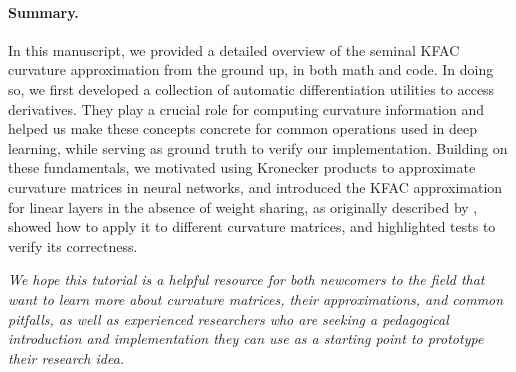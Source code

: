 \paragraph{Summary.} In this manuscript, we provided a detailed overview of the seminal KFAC curvature approximation from the ground up, in both math and code.
In doing so, we first developed a collection of automatic differentiation utilities to access derivatives.
They play a crucial role for computing curvature information and helped us make these concepts concrete for common operations used in deep learning, while serving as ground truth to verify our implementation.
Building on these fundamentals, we motivated using Kronecker products to approximate curvature matrices in neural networks, and introduced the KFAC approximation for linear layers in the absence of weight sharing, as originally described by \citet{martens2015optimizing}, showed how to apply it to different curvature matrices, and highlighted tests to verify its correctness.

\emph{We hope this tutorial is a helpful resource for both newcomers to the field that want to learn more about curvature matrices, their approximations, and common pitfalls, as well as experienced researchers who are seeking a pedagogical introduction and implementation they can use as a starting point to prototype their research idea.}

